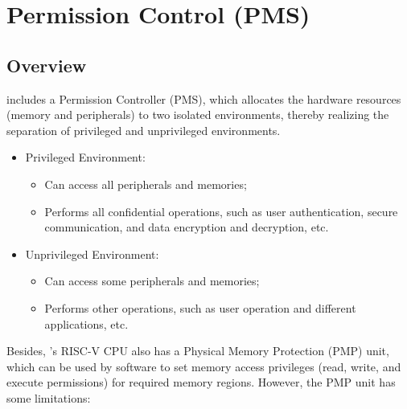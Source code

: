 \documentclass[main\_\_EN.tex]{subfiles}
\begin{document}

\ifglobal
\else
    {\let\clearpage\relax \listoftodos}
    \tableofcontents
    \listoftables
    \listoffigures
\fi



\chapter{Permission Control (PMS)}
\label{mod:permctrl}
\hypertarget{permctrl}{}


\section{Overview}

\chipname{} includes a Permission Controller (PMS), which allocates the hardware resources (memory and peripherals) to two isolated environments, thereby realizing the separation of privileged and unprivileged environments.

\begin{itemize}
    \item Privileged Environment:
    \begin{itemize}
        \item Can access all peripherals and memories;
        \item Performs all confidential operations, such as user authentication, secure communication, and data encryption and decryption, etc.
    \end{itemize}
    \item Unprivileged Environment:
    \begin{itemize}
        \item Can access some peripherals and memories;
        \item Performs other operations, such as user operation and different applications, etc.
    \end{itemize}
\end{itemize}

Besides, \chipname{}'s RISC-V CPU also has a Physical Memory Protection (PMP) unit, which can be used by software to set memory access privileges (read, write, and execute permissions) for required memory regions. However, the PMP unit has some limitations:
\end{document}
